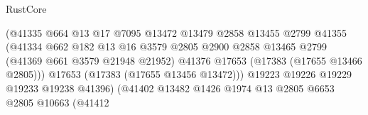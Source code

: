 \begin{lexlean}{RustCore}
\begin{coremodule}
                                                  (@41335
                                                    @664
                                                    @13
                                                    @17
                                                    @7095
                                                    @13472
                                                    @13479
                                                    @2858
                                                    @13455
                                                    @2799
                                                    @41355
                                                    (@41334
                                                      @662
                                                      @182
                                                      @13
                                                      @16
                                                      @3579
                                                      @2805
                                                      @2900
                                                      @2858
                                                      @13465
                                                      @2799
                                                      (@41369 @661 @3579 @21948 @21952)
                                                      @41376
                                                      @17653
                                                      (@17383 (@17655 @13466 @2805)))
                                                    @17653
                                                    (@17383 (@17655 @13456 @13472)))
                                                  @19223
                                                  @19226
                                                  @19229
                                                  @19233
                                                  @19238
                                                  @41396)
                                                (@41402
                                                  @13482
                                                  @1426
                                                  @1974
                                                  @13
                                                  @2805
                                                  @6653
                                                  @2805
                                                  @10663
                                                  (@41412

\end{coremodule}
\end{lexlean}
